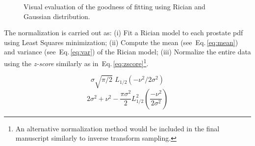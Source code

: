\begin{figure}
  \centering
  \hfill
  \hfill
  \caption{Visual evaluation of the goodness of fitting using Rician and Gaussian distribution.}
  \label{fig:fitting}
\end{figure}

The normalization is carried out as: 
(i) Fit a Rician model to each prostate \ac{pdf} using Least Squares minimization; 
(ii) Compute the mean (see~Eq.\,\eqref{eq:mean}) and variance (see~Eq.\,\eqref{eq:var}) of the Rician model;
(iii) Normalize the entire data using the \textit{z-score} similarly as in~Eq.\,\eqref{eq:zscore}\footnote{An alternative normalization method would be included in the final manuscript similarly to inverse transform sampling.}.

\begin{equation}
  \sigma  \sqrt{\pi/2}\,\,L_{1/2}(-\nu^2/2\sigma^2) 
  \label{eq:mean}
\end{equation}
\vspace{-.4cm}
\begin{equation}
  2\sigma^2+\nu^2-\frac{\pi\sigma^2}{2}L_{1/2}^2\left(\frac{-\nu^2}{2\sigma^2}\right) 
  \label{eq:var}
\end{equation}


